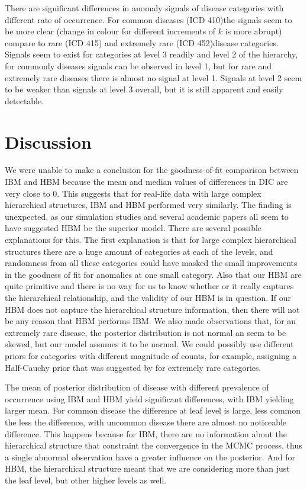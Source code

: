 \newpara

There are significant differences in anomaly signals of disease categories with different rate of occurrence. For common diseases (ICD 410)the signals seem to be more clear (change in colour for different increments of $k$ is more abrupt) compare to rare (ICD 415) and extremely rare (ICD 452)disease categories. Signals seem to exist for categories at level 3 readily and level 2 of the hierarchy, for commonly diseases signals can be observed in level 1, but for rare and extremely rare diseases there is almost no signal at level 1. Signals at level 2 seem to be weaker than signals at level 3 overall, but it is still apparent and easily detectable.  

\section{Discussion}

We were unable to make a conclusion for the goodness-of-fit comparison between IBM and HBM because the mean and median values of differences in DIC are very close to 0. This suggests that for real-life data with large complex hierarchical structures, IBM and HBM performed very similarly. The finding is unexpected, as our simulation studies and several academic papers all seem to have suggested HBM be the superior model. There are several possible explanations for this. The first explanation is that for large complex hierarchical structures there are a huge amount of categories at each of the levels, and randomness from all these categories could have masked the small improvements in the goodness of fit for anomalies at one small category. Also that our HBM are quite primitive and there is no way for us to know whether or it really captures the hierarchical relationship, and the validity of our HBM is in question. If our HBM does not capture the hierarchical structure information, then there will not be any reason that HBM performs IBM. We also made observations that, for an extremely rare disease, the posterior distribution is not normal an seem to be skewed, but our model assumes it to be normal. We could possibly use different priors for categories with different magnitude of counts, for example, assigning a Half-Cauchy prior that was suggested by \citet{gelman2006prior} for extremely rare categories. 

\newpara

The mean of posterior distribution of disease with different prevalence of occurrence using IBM and HBM yield significant differences, with IBM yielding larger mean. For common disease the difference at leaf level is large, less common the less the difference, with uncommon disease there are almost no noticeable difference. This happens because for IBM, there are no information about the hierarchical structure that constraint the convergence in the MCMC process, thus a single abnormal observation have a greater influence on the posterior. And for HBM, the hierarchical structure meant that we are considering more than just the leaf level, but other higher levels as well.  


